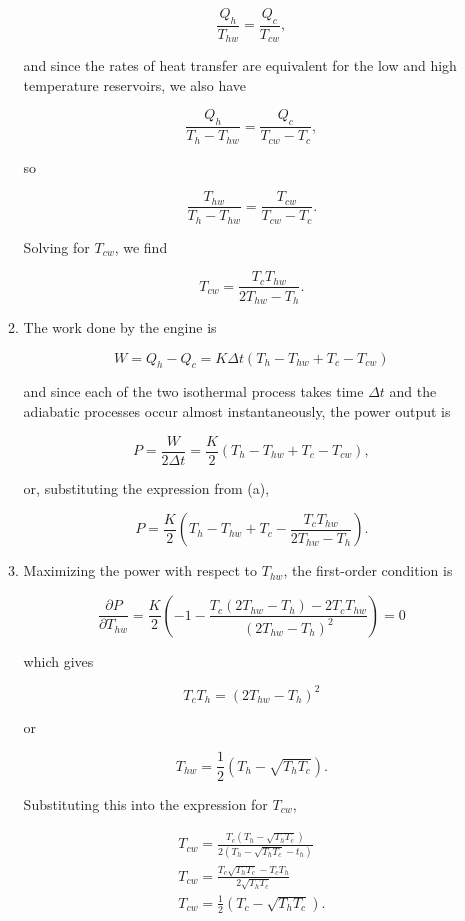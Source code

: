 \documentclass{article}
\begin{document}
\begin{enumerate}
\begin{enumerate}
		$$\frac{Q_h}{T_{hw}} = \frac{Q_c}{T_{cw}},$$

		and since the rates of heat transfer are equivalent for the low and high temperature reservoirs, we also have

		$$\frac{Q_h}{T_h - T_{hw}} = \frac{Q_c}{T_{cw} - T_c},$$

		so

		$$\frac{T_{hw}}{T_h - T_{hw}} = \frac{T_{cw}}{T_{cw} - T_c}.$$

		Solving for $T_{cw}$, we find

		$$T_{cw} = \frac{T_cT_{hw}}{2 T_{hw} - T_h}.$$

		\item

		The work done by the engine is

		$$W = Q_h - Q_c = K \Delta t (T_h - T_{hw} + T_c - T_{cw})$$

		and since each of the two isothermal process takes time $\Delta t$ and the adiabatic processes occur almost instantaneously, the power output is

		$$P = \frac{W}{2\Delta t} = \frac{K}{2} (T_h - T_{hw} + T_c - T_{cw}),$$

		or, substituting the expression from (a), 

		$$P = \frac{K}{2} \left( T_h - T_{hw} + T_c - \frac{T_cT_{hw}}{2 T_{hw} - T_h} \right).$$

		\item

		Maximizing the power with respect to $T_{hw}$, the first-order condition is

		$$
		\frac{\partial P}{\partial T_{hw}} = \frac{K}{2}\left(-1 - \frac{T_c(2T_{hw} - T_h) - 2T_c T_{hw} }{(2 T_{hw} - T_h)^2} \right) = 0
		$$

		which gives

		$$T_c T_h = (2 T_{hw} - T_h)^2$$

		or

		$$T_{hw} = \frac{1}{2} (T_h - \sqrt{T_hT_c}).$$

		Substituting this into the expression for $T_{cw}$, 

		\begin{gather*}
		T_{cw} = \frac{T_c (T_h - \sqrt{T_hT_c})}{2 (T_h - \sqrt{T_hT_c} - t_h)} \\
		T_{cw} = \frac{T_c \sqrt{T_h T_c} - T_c T_h}{2\sqrt{T_hT_c} } \\
		T_{cw} = \frac{1}{2} (T_c - \sqrt{T_h T_c}).
		\end{gather*}


\end{enumerate}
\end{enumerate}
\end{document}
